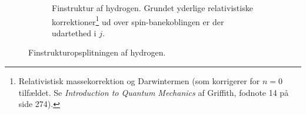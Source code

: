 \begin{figure}[!h]
\begin{subfigure}[t]{0.53\textwidth}
        \caption{Finstruktur af hydrogen. Grundet yderlige relativistiske korrektioner\footnote{Relativistisk massekorrektion og Darwintermen (som korrigerer for $n=0$ tilfældet. Se \textit{Introduction to Quantum Mechanics} af Griffith, fodnote 14 på side 274).} ud over spin-banekoblingen er der udartethed i $j$.}
        \label{fig:Q10_FinstrukturForHydrogen2}
    \end{subfigure}
    \caption{Finstrukturopsplitningen af hydrogen.}
    \label{fig:Q10_FinstrukturForHydrogen}
\end{figure}